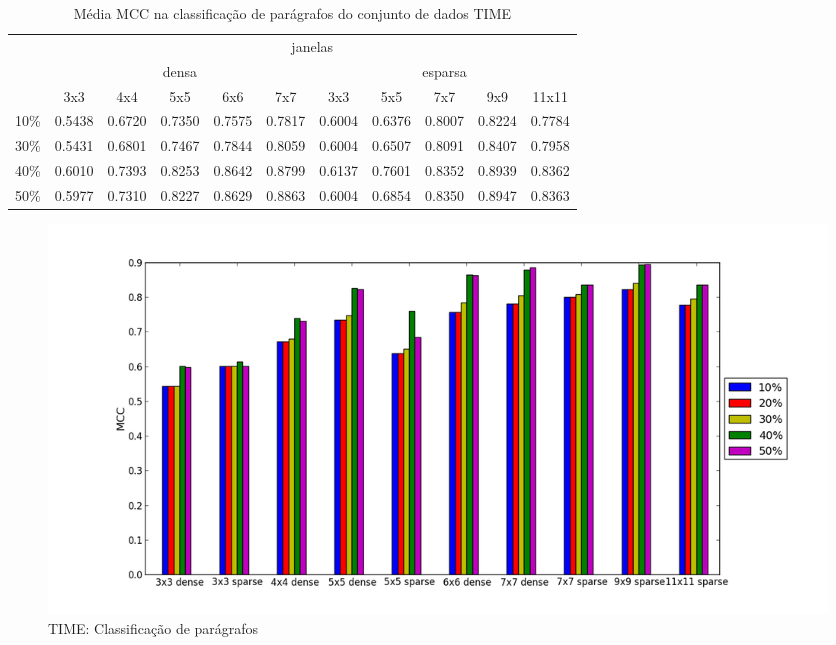 \documentclass[a4paper,11pt]{article}
\begin{document}
  \begin{center}
    \begin{table}[p]
      \caption{Média MCC na classificação de parágrafos do conjunto de dados TIME}
      \begin{tabular}{ l | c c c c c || c c c c c | }
        \cline{2-11}
        & \multicolumn{10}{|c|}{janelas} \\
        \cline{2-11}
        & \multicolumn{5}{c||}{densa} & \multicolumn{5}{c|}{esparsa} \\
        \cline{2-11}
        & 3x3 & 4x4 & 5x5 & 6x6 & 7x7 & 3x3 & 5x5 & 7x7 & 9x9 & 11x11 \\
        \hline
        \multicolumn{1}{|l|}{10\%}& 0.5438& 0.6720& 0.7350& 0.7575& 0.7817& 0.6004& 0.6376& 0.8007& 0.8224& 0.7784\\
        \multicolumn{1}{|l|}{30\%}& 0.5431& 0.6801& 0.7467& 0.7844& 0.8059& 0.6004& 0.6507& 0.8091& 0.8407& 0.7958\\
        \multicolumn{1}{|l|}{40\%}& 0.6010& 0.7393& 0.8253& 0.8642& 0.8799& 0.6137& 0.7601& 0.8352& 0.8939& 0.8362\\
        \multicolumn{1}{|l|}{50\%}& 0.5977& 0.7310& 0.8227& 0.8629& 0.8863& 0.6004& 0.6854& 0.8350& 0.8947& 0.8363\\
        \hline  
      \end{tabular}
    \end{table}
  \end{center}

  \begin{figure}[p]
    \centerline{\includegraphics[width=1.2\textwidth]{assets/experiment_charts/time_TextRegion_paragraph_mcc.png}}
    \caption{TIME: Classificação de parágrafos}
    \label{fig:time_TextRegion_paragraph_mcc}
  \end{figure}  
\end{document}
